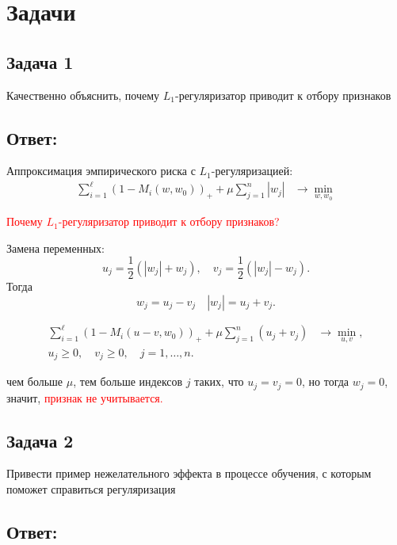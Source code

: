 \section{Задачи}

\subsection{Задача 1}

Качественно объяснить, почему $L_1$-регуляризатор приводит к отбору признаков

\subsection{Ответ:}

Аппроксимация эмпирического риска с \(L_1\)-регуляризацией:
\begin{align*}
    \sum_{i=1}^{\ell} \left(1 - M_i(w, w_0)\right)_+ + \mu \sum_{j=1}^{n} |w_j| & \rightarrow \min_{w, w_0}
\end{align*}

\textcolor{red}{Почему \(L_1\)-регуляризатор приводит к отбору признаков?}

Замена переменных: 
\[
u_j = \frac{1}{2} (|w_j| + w_j), \quad v_j = \frac{1}{2} (|w_j| - w_j).
\]
Тогда 
\[
w_j = u_j - v_j \quad |w_j| = u_j + v_j.
\]

\begin{align*}
    \sum_{i=1}^{\ell} \left(1 - M_i(u - v, w_0)\right)_+ + \mu \sum_{j=1}^{n} (u_j + v_j) & \rightarrow \min_{u, v}, \\
    u_j \geq 0, \quad v_j \geq 0, \quad j = 1, \ldots, n.
\end{align*}

чем больше \(\mu\), тем больше индексов \(j\) таких, что \(u_j = v_j = 0\), но тогда \(w_j = 0\), значит, \textcolor{red}{признак не учитывается.}

\subsection{Задача 2}

Привести пример нежелательного эффекта в процессе обучения, с которым поможет справиться регуляризация 
 
\subsection{Ответ:}

